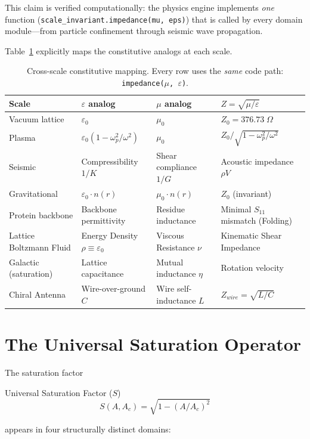 \medskip
\noindent
This claim is verified computationally: the physics engine implements
\textit{one} function (\texttt{scale\_\allowbreak invariant.\allowbreak impedance(mu,\allowbreak\ eps)}) that
is called by every domain module---from particle confinement through
seismic wave propagation.

Table~\ref{tab:cross_scale} explicitly maps the constitutive analogs at
each scale.

\begin{table}[H]
\centering\small
\caption{Cross-scale constitutive mapping.  Every row uses the
\textit{same} code path: \texttt{impedance($\mu$, $\varepsilon$)}.}
\label{tab:cross_scale}
\begin{tabularx}{\textwidth}{@{}l l l X@{}}
\toprule
\textbf{Scale} & \textbf{$\varepsilon$ analog}
  & \textbf{$\mu$ analog}
  & \textbf{$Z = \sqrt{\mu/\varepsilon}$} \\
\midrule
Vacuum lattice
  & $\varepsilon_0$
  & $\mu_0$
  & $Z_0 = 376.73\;\Omega$ \\
Plasma
  & $\varepsilon_0(1 - \omega_p^2/\omega^2)$
  & $\mu_0$
  & $Z_0/\sqrt{1-\omega_p^2/\omega^2}$ \\
Seismic
  & Compressibility $1/K$
  & Shear compliance $1/G$
  & Acoustic impedance $\rho V$ \\
Gravitational
  & $\varepsilon_0 \cdot n(r)$
  & $\mu_0 \cdot n(r)$
  & $Z_0$ (invariant) \\
Protein backbone
  & Backbone permittivity
  & Residue inductance
  & Minimal $S_{11}$ mismatch (Folding) \\
Lattice Boltzmann Fluid
  & Energy Density $\rho \equiv \varepsilon_0$
  & Viscous Resistance $\nu$
  & Kinematic Shear Impedance \\
Galactic (saturation)
  & Lattice capacitance
  & Mutual inductance $\eta$
  & Rotation velocity \\
Chiral Antenna
  & Wire-over-ground $C$
  & Wire self-inductance $L$
  & $Z_{wire} = \sqrt{L/C}$ \\
\bottomrule
\end{tabularx}
\end{table}


\section{The Universal Saturation Operator}
\label{sec:universal_saturation}

The saturation factor
\begin{resultbox}{Universal Saturation Factor ($S$)}
\begin{equation}
    S(A, A_c) = \sqrt{1 - (A/A_c)^2}
    \label{eq:saturation_sigma}
\end{equation}
\end{resultbox}
appears in four structurally distinct domains:

